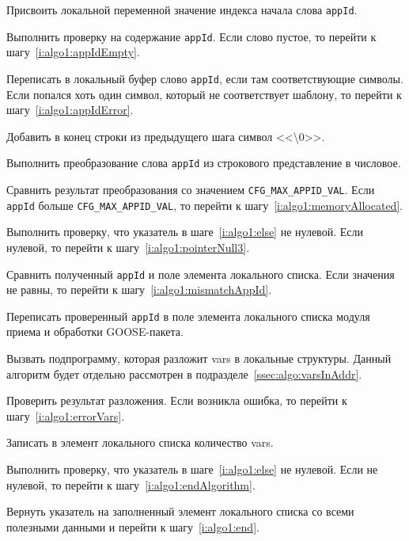 \begin{enumerate_step}
    \item Присвоить локальной переменной значение индекса начала слова \lstinline{appId}.
    \item Выполнить проверку на содержание \lstinline{appId}. Если слово пустое, то перейти к шагу~\ref{i:algo1:appIdEmpty}.
    \item Переписать в локальный буфер слово \lstinline{appId}, если там соответствующие символы. Если попался хоть один символ, который не соответствует шаблону, то перейти к шагу~\ref{i:algo1:appIdError}.
    \item Добавить в конец строки из предыдущего шага символ <<\textbackslash 0>>.
    \item Выполнить преобразование слова \lstinline{appId} из строкового представление в числовое.
    \item Сравнить результат преобразования со значением \lstinline{CFG_MAX_APPID_VAL}. Если \lstinline{appId} больше \lstinline{CFG_MAX_APPID_VAL}, то перейти к шагу~\ref{i:algo1:memoryAllocated}.
    \item Выполнить проверку, что указатель в шаге~\ref{i:algo1:else} не нулевой. Если нулевой, то перейти к шагу~\ref{i:algo1:pointerNull3}.
    \item Сравнить полученный \lstinline{appId} и поле элемента локального списка. Если значения не равны, то перейти к шагу~\ref{i:algo1:mismatchAppId}.
    \item \label{i:algo1:pointerNull3} Переписать проверенный \lstinline{appId} в поле элемента локального списка модуля приема и обработки GOOSE-пакета.
    \item Вызвать подпрограмму, которая разложит vars в локальные структуры. Данный алгоритм будет отдельно рассмотрен в подразделе~\ref{ssec:algo:varsInAddr}.
    \item Проверить результат разложения. Если возникла ошибка, то перейти к шагу~\ref{i:algo1:errorVars}.
    \item Записать в элемент локального списка количество vars.

    \item Выполнить проверку, что указатель в шаге~\ref{i:algo1:else} не нулевой. Если не нулевой, то перейти к шагу~\ref{i:algo1:endAlgorithm}.
    \item Вернуть указатель на заполненный элемент локального списка со всеми полезными данными и перейти к шагу~\ref{i:algo1:end}.


\end{enumerate_step}
